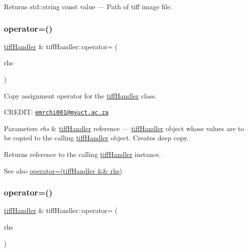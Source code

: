 \begin{DoxyReturn}{Returns}
std\+::string const value --- Path of tiff image file. 
\end{DoxyReturn}
\mbox{\label{classtiffHandler_aa48648c589647b32caf342d912d3353e}} 
\subsubsection{\texorpdfstring{operator=()}{operator=()}\hspace{0.1cm}{\footnotesize\ttfamily [1/2]}}
{\footnotesize\ttfamily \hyperlink{classtiffHandler}{tiff\+Handler} \& tiff\+Handler\+::operator= (\begin{DoxyParamCaption}\item[{const \hyperlink{classtiffHandler}{tiff\+Handler} \&}]{rhs }\end{DoxyParamCaption})}



Copy assignment operator for the \hyperlink{classtiffHandler}{tiff\+Handler} class. 

C\+R\+E\+D\+IT\+: \href{mailto:emrchi001@myuct.ac.za}{\tt emrchi001@myuct.\+ac.\+za}


\begin{DoxyParams}{Parameters}
{\em rhs} & \hyperlink{classtiffHandler}{tiff\+Handler} reference --- \hyperlink{classtiffHandler}{tiff\+Handler} object whose values are to be copied to the calling \hyperlink{classtiffHandler}{tiff\+Handler} object. Creates deep copy.\\
\hline
\end{DoxyParams}
\begin{DoxyReturn}{Returns}
reference to the calling \hyperlink{classtiffHandler}{tiff\+Handler} instance.
\end{DoxyReturn}
\begin{DoxySeeAlso}{See also}
\hyperlink{classtiffHandler_a9e7baaba5bdbb6923328be7be47b2b85}{operator=(tiff\+Handler \&\& rhs)} 
\end{DoxySeeAlso}
\mbox{\label{classtiffHandler_a9e7baaba5bdbb6923328be7be47b2b85}} 
\subsubsection{\texorpdfstring{operator=()}{operator=()}\hspace{0.1cm}{\footnotesize\ttfamily [2/2]}}
{\footnotesize\ttfamily \hyperlink{classtiffHandler}{tiff\+Handler} \& tiff\+Handler\+::operator= (\begin{DoxyParamCaption}\item[{\hyperlink{classtiffHandler}{tiff\+Handler} \&\&}]{rhs }\end{DoxyParamCaption})}



